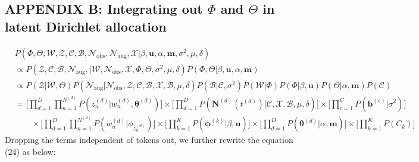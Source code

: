 \documentclass[a4paper]{article}
\begin{document}
  \subsection*{APPENDIX B: Integrating out $\Phi$ and $\Theta$ in latent Dirichlet allocation}
  \begin{equation}
  \begin{aligned}
   &  P(\Phi, \Theta, \mathcal{W}, \mathcal{Z}, \mathcal{C}, \mathcal{B}, \mathcal{N}_{\mbox{obs}}, \mathcal{N}_{\mbox{aug}}, \mathcal{X}| \beta, \boldsymbol{u}, \alpha, \boldsymbol{m}, \sigma^2, \mu, \delta)  \\& 
 \propto  P(\mathcal{Z}, \mathcal{C}, \mathcal{B}, \mathcal{N}_{\mbox{aug}}, |\mathcal{W},  \mathcal{N}_{\mbox{obs}}, \mathcal{X}, \Phi, \Theta, \sigma^2, \mu, \delta) P(\Phi, \Theta |\beta, \boldsymbol{u}, \alpha, \boldsymbol{m})
   \\&\propto P(\mathcal{Z}| \mathcal{W}, \Theta)P(\mathcal{N}_{\mbox{aug}}| \mathcal{N}_{\mbox{obs}},\mathcal{Z}, \mathcal{C}, \mathcal{B}, \mathcal{X}, \mathcal{B}, \mu, \delta)P(\mathcal{B}|\mathcal{C}, \sigma^2)P(\mathcal{W}|\Phi)P(\Phi|\beta, \boldsymbol{u})P(\Theta|\alpha, \boldsymbol{m})P(\mathcal{C})
  \\&=\Big[\prod_{d=1}^{D}\prod_{n=1}^{N^{(d)}} P( z_n^{(d)}|w_n^{(d)},  \boldsymbol{\theta}^{(d)})\Big]\times \Big[\prod_{d=1}^{D} P( \boldsymbol{N}^{(d)}(t^{(d)})|\mathcal{C}, \mathcal{X}, \mathcal{B}, \mu, \delta)\Big]  \times\Big[\prod_{c=1}^{C} P( \boldsymbol{b}^{(c)}| \sigma^2)\Big]\\&\quad \quad \times\Big[\prod_{d=1}^{D}\prod_{n=1}^{N^{(d)}} P(w_n^{(d)}| \phi_{z_n^{(d)}})\Big]\times \Big[\prod_{k=1}^{K} P( \boldsymbol{\phi}^{(k)}| \beta, \boldsymbol{u})\Big]\times \Big[\prod_{d=1}^{D} P( \boldsymbol{\theta}^{(d)}|\alpha, \boldsymbol{m})\Big]\times \Big[\prod_{k=1}^{K} P(C_k)\Big]
  \end{aligned}
  \end{equation}
  Dropping the terms independent of tokens out, we further rewrite the equation (24) as below:
\end{document}
